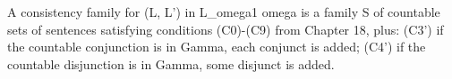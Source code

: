 A consistency family for (L, L') in L_{omega1 omega} is a family S of countable sets of sentences satisfying conditions (C0)-(C9) from Chapter 18, plus: (C3') if the countable conjunction is in Gamma, each conjunct is added; (C4') if the countable disjunction is in Gamma, some disjunct is added.
